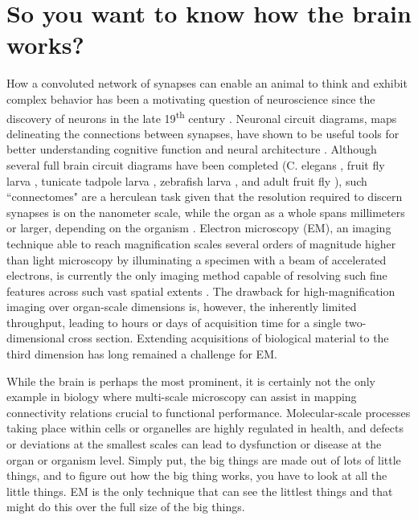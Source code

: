 \section{So you want to know how the brain works?}
\label{sec:1_brain}

How a convoluted network of synapses can enable an animal to think and exhibit complex behavior has been a motivating question of neuroscience since the discovery of neurons in the late 19\textsuperscript{th} century \cite{ramon1899textura, finger2001origins}. Neuronal circuit diagrams, maps delineating the connections between synapses, have shown to be useful tools for better understanding cognitive function and neural architecture \cite{helmstaedter20083d, kasthuri2015saturated}. Although several full brain circuit diagrams have been completed (C. elegans \cite{white1986structure}, fruit fly larva \cite{ohyama2015multilevel}, tunicate tadpole larva \cite{ryan2016cns}, zebrafish larva \cite{hildebrand2017whole}, and adult fruit fly \cite{zheng2018complete}), such ``connectomes" are a herculean task given that the resolution required to discern synapses is on the nanometer scale, while the organ as a whole spans millimeters or larger, depending on the organism \cite{lichtman2008ome, bock2011network, kornfeld2018progress}. Electron microscopy (EM), an imaging technique able to reach magnification scales several orders of magnitude higher than light microscopy by illuminating a specimen with a beam of accelerated electrons, is currently the only imaging method capable of resolving such fine features across such vast spatial extents \cite{helmstaedter20083d, zheng2018complete}. The drawback for high-magnification imaging over organ-scale dimensions is, however, the inherently limited throughput, leading to hours or days of acquisition time for a single two-dimensional cross section. Extending acquisitions of biological material to the third dimension has long remained a challenge for EM.

While the brain is perhaps the most prominent, it is certainly not the only example in biology where multi-scale microscopy can assist in mapping connectivity relations crucial to functional performance. Molecular-scale processes taking place within cells or organelles are highly regulated in health, and defects or deviations at the smallest scales can lead to dysfunction or disease at the organ or organism level. Simply put, the big things are made out of lots of little things, and to figure out how the big thing works, you have to look at all the little things. EM is the only technique that can see the littlest things and that might do this over the full size of the big things.


